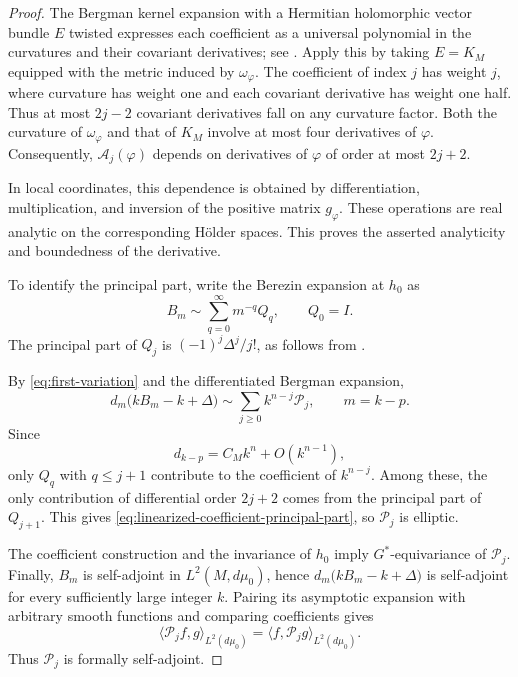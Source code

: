\documentclass[11pt,reqno]{amsart}
\theoremstyle{corollary}
\theoremstyle{conjecture}
\theoremstyle{assumption}
\theoremstyle{proposition}
\theoremstyle{remark}
\numberwithin{equation}{section}
\begin{document}
\begin{proof}
The Bergman kernel expansion with a Hermitian holomorphic vector bundle $E$ twisted expresses each coefficient as a universal polynomial in the curvatures and their covariant derivatives; see \cite[Theorems~1.1 and~1.3 and \S4]{DaiLiuMa2006}. Apply this by taking $E=K_M$ equipped with the metric induced by $\omega_\varphi$. The coefficient of index $j$ has weight $j$, where curvature has weight one and each covariant derivative has weight one half. Thus at most $2j-2$ covariant derivatives fall on any curvature factor. Both the curvature of $\omega_\varphi$ and that of $K_M$ involve at most four derivatives of $\varphi$. Consequently, $\mathcal A_j(\varphi)$ depends on derivatives of $\varphi$ of order at most $2j+2$.

In local coordinates, this dependence is obtained by differentiation, multiplication, and inversion of the positive matrix $g_\varphi$. These operations are real analytic on the corresponding Hölder spaces. This proves the asserted analyticity and boundedness of the derivative.

To identify the principal part, write the Berezin expansion at $h_0$ as
\[
B_m\sim\sum_{q=0}^{\infty}m^{-q}Q_q, \qquad Q_0=I.
\]
The principal part of $Q_j$ is $(-1)^j\Delta^j/j!$, as follows from \cite[equations~(2.23) and~(3.9)]{Englis2000}.

By \eqref{eq:first-variation} and the differentiated
Bergman expansion,
\[
d_m\bigl(kB_m-k+\Delta\bigr)\sim\sum_{j\geq 0}k^{n-j}\mathcal P_j,\qquad m=k-p.
\]
Since
\[
d_{k-p}=C_Mk^n+O(k^{n-1}),
\]
only $Q_q$ with $q\le j+1$ contribute to the coefficient of $k^{n-j}$. Among these, the only contribution of differential order $2j+2$ comes from the principal part of $Q_{j+1}$. This gives \eqref{eq:linearized-coefficient-principal-part}, so $\mathcal P_j$ is elliptic.

The coefficient construction and the invariance of $h_0$ imply $G^*$-equivariance of $\mathcal P_j$. Finally, $B_m$ is self-adjoint in $L^2(M,d\mu_0)$, hence $d_m\bigl(kB_m-k+\Delta\bigr)$ is self-adjoint for every sufficiently large integer $k$. Pairing its asymptotic expansion with arbitrary smooth functions and comparing coefficients gives
\[
\langle\mathcal P_jf,g\rangle_{L^2(d\mu_0)}=\langle f,\mathcal P_jg\rangle_{L^2(d\mu_0)}.
\]
Thus $\mathcal P_j$ is formally self-adjoint.
\end{proof}
\end{document}
